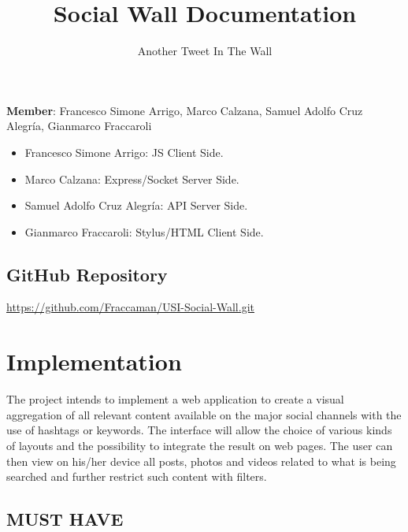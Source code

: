 \documentclass[]{article}
\begin{document}
\title{Social Wall Documentation}
\author{Another Tweet In The Wall}
\maketitle
\textbf{Member}: Francesco Simone Arrigo, Marco Calzana, Samuel Adolfo Cruz Alegr\'{i}a, Gianmarco Fraccaroli 
\begin{itemize}
\subsection*{Work Division}
\item Francesco Simone Arrigo: JS Client Side.
\item Marco Calzana: Express/Socket Server Side.
\item Samuel Adolfo Cruz Alegr\'{i}a: API Server Side.
\item Gianmarco Fraccaroli: Stylus/HTML Client Side.
\end{itemize}

\subsection*{GitHub Repository}
\url{https://github.com/Fraccaman/USI-Social-Wall.git}
\section*{Implementation}
The project intends to implement a web application to create a visual aggregation of all relevant content available on the major social channels with the use of hashtags or keywords. The interface will allow the choice of various kinds of layouts and the possibility to integrate the result on web pages. The user can then view on his/her device all posts, photos and videos related to what is being searched and further restrict such content with filters.
\subsection{MUST HAVE}
\end{document}
